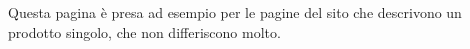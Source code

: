 Questa pagina è presa ad esempio per le pagine del sito che descrivono un prodotto singolo, che non differiscono molto.